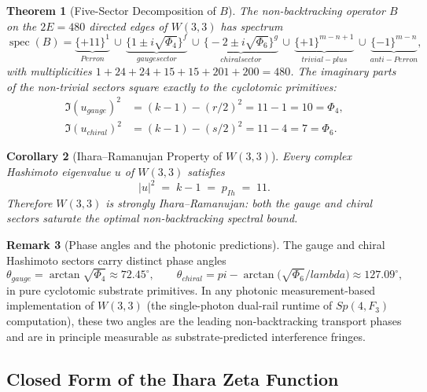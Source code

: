 \documentclass[12pt,a4paper]{article}
\def\mathbb#1{#1}%
\def\mathrm#1{#1}%
\def\text#1{#1}%
\def\lambda{lambda}%
\def\Phi#1{Phi#1}%
\def\pi{pi}%
\newtheorem{theorem}{Theorem}[section]
\newtheorem{corollary}[theorem]{Corollary}
\theoremstyle{definition}
\newtheorem{remark}[theorem]{Remark}
\providecommand{\spec}{\operatorname{spec}}
\newcommand{\Sp}{\mathrm{Sp}}
\newcommand{\FF}{\mathbb{F}}
\begin{document}
\begin{theorem}[Five-Sector Decomposition of $B$]
\label{thm:hashimoto-5}
The non-backtracking operator $B$ on the $2E = 480$ directed edges of
$W(3,3)$ has spectrum
\begin{equation}
\spec(B) =
\underbrace{\{+11\}^{1}}_{\text{Perron}}
\,\cup\,
\underbrace{\bigl\{1 \pm i\sqrt{\Phi_4}\bigr\}^{f}}_{\text{gauge sector}}
\,\cup\,
\underbrace{\bigl\{-2 \pm i\sqrt{\Phi_6}\bigr\}^{g}}_{\text{chiral sector}}
\,\cup\,
\underbrace{\{+1\}^{m-n+1}}_{\text{trivial-plus}}
\,\cup\,
\underbrace{\{-1\}^{m-n}}_{\text{anti-Perron}},
\end{equation}
with multiplicities $1+24+24+15+15+201+200 = 480$.  The imaginary parts
of the non-trivial sectors square exactly to the cyclotomic primitives:
\begin{equation}
\begin{aligned}
\Im(u_{\mathrm{gauge}})^2
  &= (k-1) - (r/2)^2 = 11 - 1 = 10 = \Phi_4,\\
\Im(u_{\mathrm{chiral}})^2
  &= (k-1) - (s/2)^2 = 11 - 4 = 7 = \Phi_6.
\end{aligned}
\end{equation}
\end{theorem}

\begin{corollary}[Ihara--Ramanujan Property of $W(3,3)$]
\label{cor:ramanujan}
Every complex Hashimoto eigenvalue $u$ of $W(3,3)$ satisfies
\[
|u|^2 \;=\; k-1 \;=\; p_{\mathrm{Ih}} \;=\; 11.
\]
Therefore $W(3,3)$ is strongly Ihara--Ramanujan: both the gauge and
chiral sectors saturate the optimal non-backtracking spectral bound.
\end{corollary}

\begin{remark}[Phase angles and the photonic predictions]
The gauge and chiral Hashimoto sectors carry distinct phase angles
\[
\theta_{\mathrm{gauge}} = \arctan\!\sqrt{\Phi_4} \approx 72.45^\circ,
\qquad
\theta_{\mathrm{chiral}} = \pi - \arctan\!\bigl(\sqrt{\Phi_6}/\lambda\bigr) \approx 127.09^\circ,
\]
in pure cyclotomic substrate primitives.  In any photonic
measurement-based implementation of $W(3,3)$ (the single-photon
dual-rail runtime of $\Sp(4,\FF_3)$ computation), these two angles
are the leading non-backtracking transport phases and are in principle
measurable as substrate-predicted interference fringes.
\end{remark}

\subsection{Closed Form of the Ihara Zeta Function}
\end{document}
